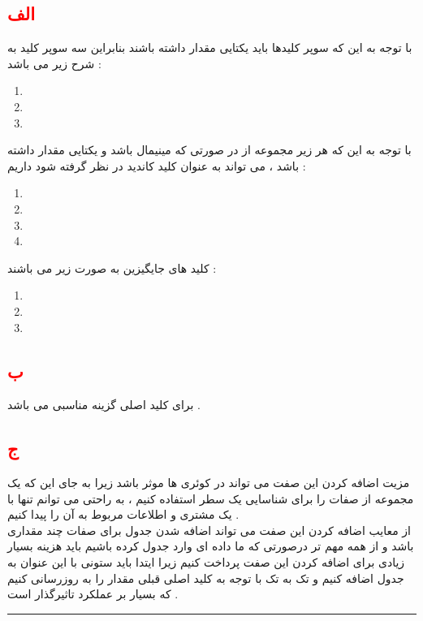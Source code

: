 \documentclass{article}
\begin{document}
\subsection*{\textcolor{red}{الف}}
با توجه به این که سوپر کلیدها باید یکتایی مقدار داشته باشند بنابراین سه سوپر کلید به شرح زیر می باشد  : 
\begin{center}
	\begin{enumerate}
		\item {}
		\item {}
		\item {}
	\end{enumerate}
\end{center}
با توجه به این که هر زیر مجموعه از
در صورتی که مینیمال باشد و یکتایی مقدار داشته باشد ، می تواند به عنوان کلید کاندید در نظر گرفته شود داریم  : 
\begin{center}
	\begin{enumerate}
		\item {}
		\item {}
		\item {}
		\item {}
	\end{enumerate}
\end{center}
کلید های جایگیزین به صورت زیر می باشند   : 
\begin{center}
	\begin{enumerate}
		\item {}
		\item {}
		\item {}
	\end{enumerate}
\end{center}
\subsection*{\textcolor{red}{ب}}
برای کلید اصلی 
 گزینه مناسبی می باشد . 
 
\subsection*{\textcolor{red}{ج}}
مزیت اضافه کردن این صفت می تواند در 
کوئری ها موثر باشد زیرا به جای این که یک مجموعه از صفات را برای شناسایی یک سطر استفاده کنیم ، به راحتی می توانم تنها با 
یک مشتری و اطلاعات مربوط به آن را پیدا کنیم  . 
\\
از معایب اضافه کردن این صفت می تواند اضافه شدن جدول برای صفات چند مقداری باشد و از همه مهم تر درصورتی که ما داده ای وارد جدول کرده باشیم باید هزینه بسیار زیادی برای اضافه کردن این صفت پرداخت کنیم زیرا ایتدا باید ستونی با این عنوان به جدول اضافه کنیم و تک به تک با توجه به کلید اصلی قبلی مقدار 
را به روزرسانی کنیم که بسیار بر عملکرد 
تاثیرگذار است . 
\hrule
\end{document}
